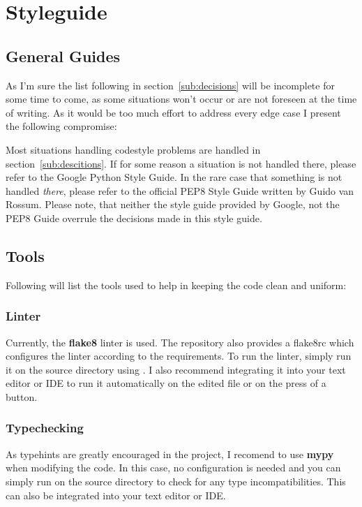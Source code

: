 \section{Styleguide}

\subsection{General Guides}
As I'm sure the list following in section~\ref{sub:decisions} will be
incomplete for some time to come, as some situations won't occur or are not
foreseen at the time of writing. As it would be too much effort to address every
edge case I present the following compromise:

Most situations handling codestyle problems are handled in
section~\ref{sub:descitions}. If for some reason a situation is not handled
there, please refer to the Google Python Style Guide. 
In the rare case that something is not handled \emph{there}, please refer to the
official PEP8 Style Guide written by Guido van Rossum.
Please note, that neither the style guide provided by Google, not the PEP8 Guide
overrule the decisions made in this style guide.

\subsection{Tools}
Following will list the tools used to help in keeping the code clean
and uniform:

\subsubsection{Linter}
Currently, the \textbf{flake8} linter is used. The repository also provides a
flake8rc which configures the linter according to the requirements. To run the
linter, simply run it on the source directory using . I also
recommend integrating it into your text editor or IDE to run it automatically
on the edited file or on the press of a button. 

\subsubsection{Typechecking}
As typehints are greatly encouraged in the project, I recomend to
use \textbf{mypy} when modifying the code. In this case, no configuration is
needed and you can simply run  on the source directory to check
for any type incompatibilities. This can also be integrated into your
text editor or IDE.

